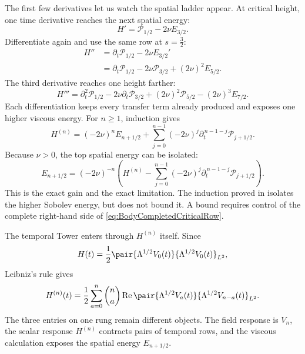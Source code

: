 The first few derivatives let us watch the spatial ladder appear.
At critical height, one time derivative reaches the next spatial energy:
\[
  H'=\mathcal P_{1/2}-2\nu E_{3/2}.
\]
Differentiate again and use the same row at \(s=\tfrac32\):
\[
\begin{aligned}
  H''
  &=\partial_t\mathcal P_{1/2}-2\nu E_{3/2}'
  \\
  &=\partial_t\mathcal P_{1/2}
  -2\nu\mathcal P_{3/2}
  +(2\nu)^2E_{5/2}.
\end{aligned}
\]
The third derivative reaches one height farther:
\[
  H'''
  =\partial_t^2\mathcal P_{1/2}
  -2\nu\partial_t\mathcal P_{3/2}
  +(2\nu)^2\mathcal P_{5/2}
  -(2\nu)^3E_{7/2}.
\]
Each differentiation keeps every transfer term already produced and exposes one higher viscous energy.
For \(n\geq1\), induction gives
\begin{equation}\label{eq:BodyCriticalHeightSpatialAscent}
  H^{(n)}
  =(-2\nu)^nE_{n+1/2}
  +\sum_{j=0}^{n-1}
  (-2\nu)^j
  \partial_t^{\,n-1-j}\mathcal P_{j+1/2}.
\end{equation}
Because \(\nu>0\), the top spatial energy can be isolated:
\begin{equation}\label{eq:BodyCompletedCriticalRow}
  E_{n+1/2}
  =(-2\nu)^{-n}
  \left(
    H^{(n)}
    -\sum_{j=0}^{n-1}
      (-2\nu)^j
      \partial_t^{\,n-1-j}\mathcal P_{j+1/2}
  \right).
\end{equation}
This is the exact gain and the exact limitation.
The induction proved in  isolates the higher Sobolev energy, but does not bound it.
A bound requires control of the complete right-hand side of \eqref{eq:BodyCompletedCriticalRow}.

The temporal Tower enters through \(H^{(n)}\) itself.
Since
\[
  H(t)
  =\frac12
  \pair{\Lambda^{1/2}V_0(t)}
       {\Lambda^{1/2}V_0(t)}_{L^2},
\]
Leibniz's rule gives
\begin{equation}\label{eq:BodyHeightDerivativeTemporalContraction}
  H^{(n)}(t)
  =\frac12\sum_{a=0}^{n}\binom{n}{a}
  \operatorname{Re}
  \pair{\Lambda^{1/2}V_a(t)}
       {\Lambda^{1/2}V_{n-a}(t)}_{L^2}.
\end{equation}
The three entries on one rung remain different objects.
The field response is \(V_n\), the scalar response \(H^{(n)}\) contracts pairs of temporal rows, and the viscous calculation exposes the spatial energy \(E_{n+1/2}\).


